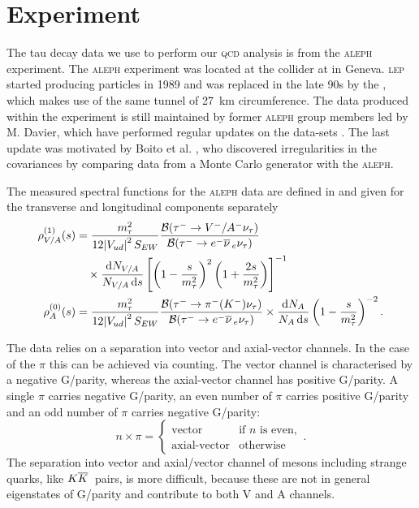\documentclass[../../index.tex]{subfiles}
\begin{document}
\section{Experiment}
The tau decay data we use to perform our \textsc{qcd} analysis is from the
\textsc{aleph} experiment. The \textsc{aleph} experiment was located at the
 collider at  in Geneva. \textsc{lep} started producing
particles in 1989 and was replaced in the late 90s by the
, which makes use of the same tunnel of
\SI{27}{\kilo\meter} circumference. The data produced within the experiment is
still maintained by former \textsc{aleph} group members led by M. Davier, which
have performed regular updates on the data-sets
\cite{Davier2013,Davier2008,Aleph2005}. The last update was motivated by Boito
et al. \cite{Boito2010}, who discovered irregularities in the covariances by
comparing data from a Monte Carlo generator with the \textsc{aleph}.

The measured spectral functions for the \textsc{aleph} data are defined in
\cite{Davier2007} and given for the transverse and longitudinal components
separately
\begin{equation}
  \begin{split}
    \rho^{(1)}_{V/A}(s) &= \frac{m_\tau^2}{12 \abs{V_{ud}}^2S_{EW}} \frac{\mathcal{B}(\tau^- \to V^-/A^- \nu_\tau)}{\mathcal{B}(\tau^- \to e^- \anti{\nu}_e \nu_\tau)} \\
    &\quad\times \frac{\dif N_{V/A}}{N_{V/A}\dif s} \left[ \left( 1 - \frac{s}{m_\tau^2} \right)^2 \left( 1 + \frac{2s}{m_\tau^2} \right) \right]^{-1} \\
    \rho^{(0)}_{A}(s) &= \frac{m_\tau^2}{12 \abs{V_{ud}}^2 S_{EW}}
    \frac{\mathcal{B}(\tau^- \to \pi^-(K^-) \nu_\tau)}{\mathcal{B}(\tau^- \to
      e^- \anti{\nu}_e \nu_\tau)} \times \frac{\dif N_A}{N_A \dif s} \left( 1 -
      \frac{s}{m_\tau^2} \right)^{-2}.
  \end{split}
\end{equation}

The data relies on a separation into vector and axial-vector channels. In the
case of the \(\pi\) this can be achieved via counting. The vector channel is
characterised by a negative G\-/parity, whereas the axial-vector channel has
positive G\-/parity. A single \(\pi\) carries negative G\-/parity, an even
number of \(\pi\) carries positive G\-/parity and an odd number of \(\pi\)
carries negative G\-/parity:
\begin{equation}
  n \times \pi = \begin{cases} \mbox{vector} & \mbox{if } n \text{ is even}, \\ \mbox{axial-vector} & \mbox{otherwise} \end{cases}.
\end{equation}
The separation into vector and axial\-/vector channel of mesons including
strange quarks, like \(K\overline{K}\,\) pairs, is more difficult, because these are
not in general eigenstates of G\-/parity and contribute to both \textsc{V} and
\textsc{A} channels.
\end{document}
